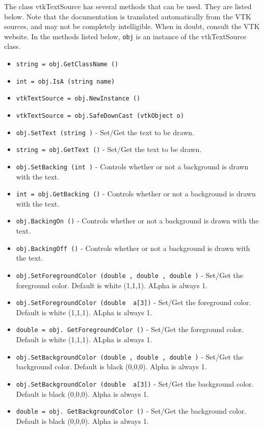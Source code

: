 The class vtkTextSource has several methods that can be used.
  They are listed below.
Note that the documentation is translated automatically from the VTK sources,
and may not be completely intelligible.  When in doubt, consult the VTK website.
In the methods listed below, \verb|obj| is an instance of the vtkTextSource class.
\begin{itemize}
\item  \verb|string = obj.GetClassName ()|

\item  \verb|int = obj.IsA (string name)|

\item  \verb|vtkTextSource = obj.NewInstance ()|

\item  \verb|vtkTextSource = obj.SafeDownCast (vtkObject o)|

\item  \verb|obj.SetText (string )| -  Set/Get the text to be drawn.

\item  \verb|string = obj.GetText ()| -  Set/Get the text to be drawn.

\item  \verb|obj.SetBacking (int )| -  Controls whether or not a background is drawn with the text.

\item  \verb|int = obj.GetBacking ()| -  Controls whether or not a background is drawn with the text.

\item  \verb|obj.BackingOn ()| -  Controls whether or not a background is drawn with the text.

\item  \verb|obj.BackingOff ()| -  Controls whether or not a background is drawn with the text.

\item  \verb|obj.SetForegroundColor (double , double , double )| -  Set/Get the foreground color. Default is white (1,1,1). ALpha is always 1.

\item  \verb|obj.SetForegroundColor (double  a[3])| -  Set/Get the foreground color. Default is white (1,1,1). ALpha is always 1.

\item  \verb|double = obj. GetForegroundColor ()| -  Set/Get the foreground color. Default is white (1,1,1). ALpha is always 1.

\item  \verb|obj.SetBackgroundColor (double , double , double )| -  Set/Get the background color. Default is black (0,0,0). Alpha is always 1.

\item  \verb|obj.SetBackgroundColor (double  a[3])| -  Set/Get the background color. Default is black (0,0,0). Alpha is always 1.

\item  \verb|double = obj. GetBackgroundColor ()| -  Set/Get the background color. Default is black (0,0,0). Alpha is always 1.

\end{itemize}
